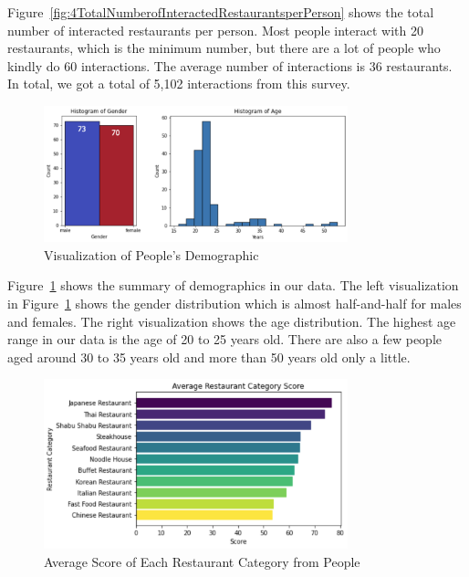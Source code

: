 \documentclass[12pt,oneside,openright,a4paper]{cpe-english-project}
\begin{document}
Figure~\ref{fig:4TotalNumberofInteractedRestaurantsperPerson} shows the total number of interacted restaurants per person. Most people interact with 20 restaurants, which is the minimum number, but there are a lot of people who kindly do 60 interactions. The average number of interactions is 36 restaurants. In total, we got a total of 5,102 interactions from this survey.

\begin{figure}[H]\centering
\includegraphics[width=250pt]{./images/4VisualizationofPeoplesDemographic.png}
\caption{Visualization of People’s Demographic}\label{fig:4VisualizationofPeoplesDemographic}
\end{figure}\vspace{-24pt}

Figure~\ref{fig:4VisualizationofPeoplesDemographic} shows the summary of demographics in our data. The left visualization in Figure~\ref{fig:4VisualizationofPeoplesDemographic} shows the gender distribution which is almost half-and-half for males and females. The right visualization shows the age distribution. The highest age range in our data is the age of 20 to 25 years old. There are also a few people aged around 30 to 35 years old and more than 50 years old only a little.

\begin{figure}[H]\centering
\includegraphics[width=250pt]{./images/4AverageScoreofEachRestaurantCategoryfromPeople.png}
\caption{Average Score of Each Restaurant Category from People}\label{fig:4AverageScoreofEachRestaurantCategoryfromPeople}
\end{figure}\vspace{-24pt}
\end{document}
